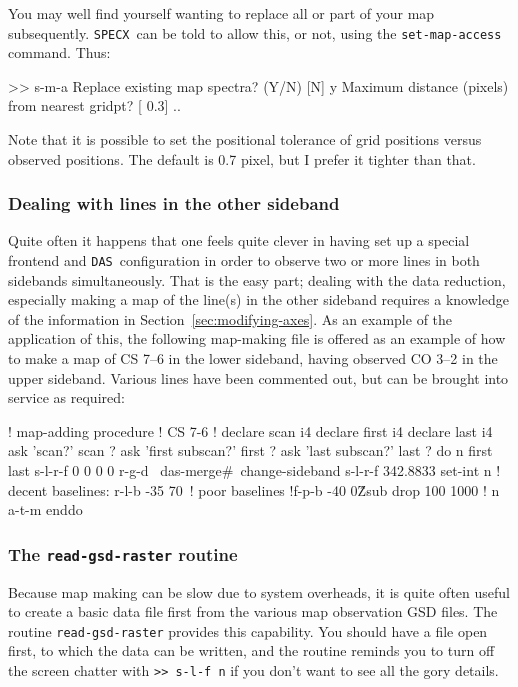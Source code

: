 \documentclass[11pt,twoside]{starlink}
\providecommand{\SPECX}{\texttt{SPECX}}
\providecommand{\das}{\texttt{DAS}}
\begin{document}
You may well find yourself wanting to replace all or part of your map
subsequently. \SPECX\ can be told to allow this, or not, using the
\texttt{set-map-access} command. Thus:
\begin{terminalv}
>> s-m-a
Replace existing map spectra? (Y/N) [N] y
Maximum distance (pixels) from nearest gridpt? [   0.3]
..
\end{terminalv}
Note that it is possible to set the positional tolerance of grid
positions versus observed positions. The default is 0.7 pixel, but I
prefer it tighter than that.

\subsubsection{Dealing with lines in the other sideband}
\label{sec:other-sideband-maps}
Quite often it happens that one feels quite clever in having set up a
special frontend and \das\ configuration in order to observe two or
more lines in both sidebands simultaneously. That is the easy part;
dealing with the data reduction, especially making a map of the
line(s) in the other sideband requires a knowledge of the information
in Section~\ref{sec:modifying-axes}. As an example of the application
of this, the following map-making file is offered as an example of how
to make a map of CS 7--6 in the lower sideband, having observed CO
3--2 in the upper sideband. Various lines have been commented out, but
can be brought into service as required:
\begin{terminalv}
! map-adding procedure
! CS 7-6
!
declare scan i4
declare first i4
declare last i4
ask 'scan?' scan ?
ask 'first subscan?' first ?
ask 'last subscan?' last ?
do n first last
s-l-r-f 0 0 0 0
r-g-d \scan\n\
das-merge\#\n\
change-sideband
s-l-r-f 342.8833
set-int n
! decent baselines:
r-l-b -35 70\
! poor baselines
!f-p-b -40 0\^Z\3\;sub
drop 100 1000
! n
a-t-m
enddo
\end{terminalv}

\subsubsection{The \texttt{read-gsd-raster} routine}
\label{sec:r-g-r}
Because map making can be slow due to system overheads, it is quite
often useful to create a basic data file first from the various map
observation GSD files. The routine \texttt{read-gsd-raster} provides this
capability. You should have a file open first, to which the data can
be written, and the routine reminds you to turn off the screen chatter
with \verb|>> s-l-f n| if you don't want to see all the gory details.
\end{document}
